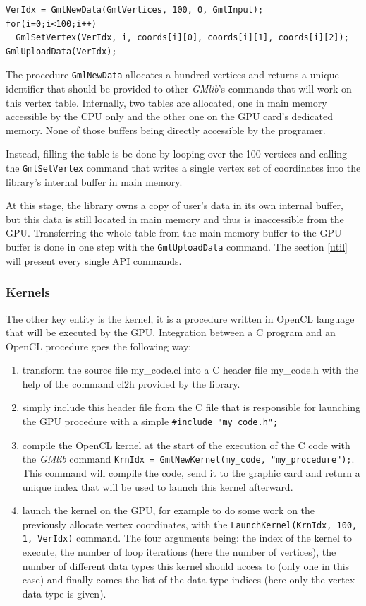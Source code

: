 \documentclass[a4paper,12pt]{article}
\begin{document}
\begin{tt}
\begin{verbatim}
VerIdx = GmlNewData(GmlVertices, 100, 0, GmlInput);
for(i=0;i<100;i++)
  GmlSetVertex(VerIdx, i, coords[i][0], coords[i][1], coords[i][2]);
GmlUploadData(VerIdx);
\end{verbatim}
\end{tt}
\normalfont

The procedure {\tt GmlNewData} allocates a hundred vertices and returns a unique identifier that should be provided to other \emph{GMlib}'s commands that will work on this vertex table. Internally, two tables are allocated, one in main memory accessible by the CPU only and the other one on the GPU card's dedicated memory. None of those buffers being directly accessible by the programer.

Instead, filling the table is be done by looping over the 100 vertices and calling the {\tt GmlSetVertex} command that writes a single vertex set of coordinates into the library's internal buffer in main memory.

At this stage, the library owns a copy of user's data in its own internal buffer, but this data is still located in main memory and thus is inaccessible from the GPU. Transferring the whole table from the main memory buffer to the GPU buffer is done in one step with the {\tt GmlUploadData} command. The section \ref{util} will present every single API commands.

\subsubsection*{Kernels}
The other key entity is the kernel, it is a procedure written in OpenCL language that will be executed by the GPU. Integration between a C program and an OpenCL procedure goes the following way:

\begin{enumerate}
\item transform the source file my\_code.cl into a C header file my\_code.h with the help of the command cl2h provided by the library.
\item simply include this header file from the C file that is responsible for launching the GPU procedure with a simple
 {\tt \#include "my\_code.h";}
\item compile the OpenCL kernel at the start of the execution of the C code with the \emph{GMlib} command {\tt KrnIdx = GmlNewKernel(my\_code, "my\_procedure");}. This command will compile the code, send it to the graphic card and return a unique index that will be used to launch this kernel afterward.
\item launch the kernel on the GPU, for example to do some work on the previously allocate vertex coordinates, with the {\tt LaunchKernel(KrnIdx, 100, 1, VerIdx)} command. The four arguments being: the index of the kernel to execute, the number of loop iterations (here the number of vertices), the number of different data types this kernel should access to (only one in this case) and finally comes the list of the data type indices (here only the vertex data type is given).
\end{enumerate}
\end{document}
